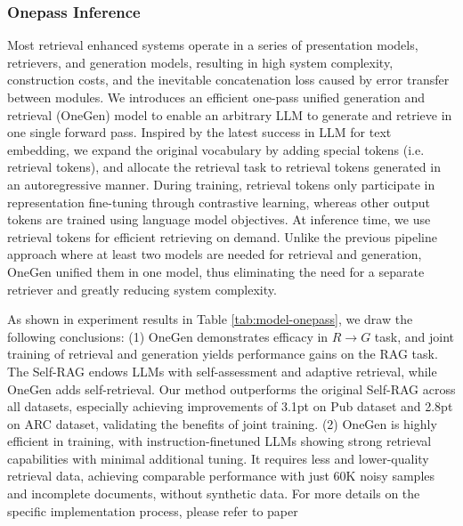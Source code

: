 \documentclass{article}
\begin{document}
\subsubsection{Onepass Inference}
Most retrieval enhanced systems operate in a series of presentation models, retrievers, and generation models, resulting in high system complexity, construction costs, and the inevitable concatenation loss caused by error transfer between modules. We introduces an efficient one-pass unified generation and retrieval (OneGen)  model to enable an arbitrary LLM to generate and retrieve in one single forward pass. Inspired by the latest success in LLM for text embedding, we expand the original vocabulary by adding special tokens (i.e. retrieval tokens), and allocate the retrieval task to retrieval tokens generated in an autoregressive manner. During training, retrieval tokens only participate in representation fine-tuning through contrastive learning, whereas other output tokens are trained using language model objectives. At inference time, we use retrieval tokens for efficient retrieving on demand.  Unlike the previous pipeline approach where at least two models are needed for retrieval and generation, OneGen unified them in one model, thus eliminating the need for a separate retriever and greatly reducing system complexity. 

As shown in experiment results in Table \ref{tab:model-onepass}, we draw the following conclusions: 
(1) OneGen demonstrates efficacy in ${R \rightarrow G}$ task, and joint training of retrieval and generation yields performance gains on the RAG task. The Self-RAG endows LLMs with self-assessment and adaptive retrieval, while OneGen adds self-retrieval. Our method outperforms the original Self-RAG across all datasets, especially achieving improvements of 3.1pt on Pub dataset and 2.8pt on ARC dataset, validating the benefits of joint training.
(2) OneGen is highly efficient in training, with instruction-finetuned LLMs showing strong retrieval capabilities with minimal additional tuning. It requires less and lower-quality retrieval data, achieving comparable performance with just 60K noisy samples and incomplete documents, without synthetic data. For more details on the specific implementation process, please refer to paper\cite{onepass}
\end{document}

